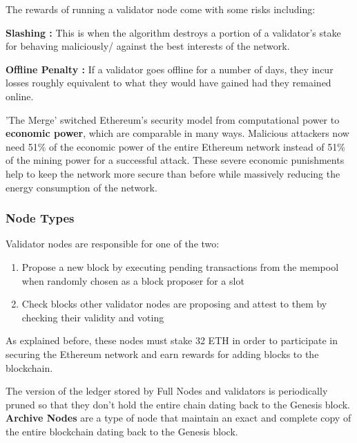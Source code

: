 The rewards of running a validator node come with some risks including:
 
\textbf{Slashing :}
This is when the algorithm destroys a portion of a validator's stake for behaving maliciously/ against the best interests of the network.

\textbf{Offline Penalty :}
If a validator goes offline for a number of days, they incur losses roughly equivalent to what they would have gained had they remained online. 

'The Merge' switched Ethereum's security model from computational power to \textbf{economic power}, which are comparable in many ways. Malicious attackers now need 51\% of the economic power of the entire Ethereum network instead of 51\% of the mining power for a successful attack. These severe economic punishments help to keep the network more secure than before while massively reducing the energy consumption of the network. 



\subsubsection{Node Types}

Validator nodes are responsible for one of the two:
\begin{enumerate}
    \item Propose a new block by executing pending transactions from the mempool when randomly chosen as a block proposer for a slot
    \item Check blocks other validator nodes are proposing and attest to them by checking their validity and voting 
\end{enumerate}
As explained before, these nodes must stake 32 ETH in order to participate in securing the Ethereum network and earn rewards for adding blocks to the blockchain.

The version of the ledger stored by Full Nodes and validators is periodically pruned so that they don't hold the entire chain dating back to the Genesis block. \textbf{Archive Nodes} are a type of node that maintain an exact and complete copy of the entire blockchain dating back to the Genesis block. 

